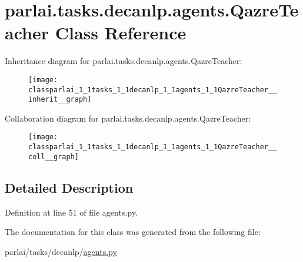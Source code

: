 \hypertarget{classparlai_1_1tasks_1_1decanlp_1_1agents_1_1QazreTeacher}{}\section{parlai.\+tasks.\+decanlp.\+agents.\+Qazre\+Teacher Class Reference}
\label{classparlai_1_1tasks_1_1decanlp_1_1agents_1_1QazreTeacher}


Inheritance diagram for parlai.\+tasks.\+decanlp.\+agents.\+Qazre\+Teacher\+:
\nopagebreak
\begin{figure}[H]
\begin{center}
\leavevmode
\texttt{[image: classparlai\_1\_1tasks\_1\_1decanlp\_1\_1agents\_1\_1QazreTeacher\_\_inherit\_\_graph]}
\end{center}
\end{figure}


Collaboration diagram for parlai.\+tasks.\+decanlp.\+agents.\+Qazre\+Teacher\+:
\nopagebreak
\begin{figure}[H]
\begin{center}
\leavevmode
\texttt{[image: classparlai\_1\_1tasks\_1\_1decanlp\_1\_1agents\_1\_1QazreTeacher\_\_coll\_\_graph]}
\end{center}
\end{figure}


\subsection{Detailed Description}


Definition at line 51 of file agents.\+py.



The documentation for this class was generated from the following file\+:\begin{DoxyCompactItemize}
\item 
parlai/tasks/decanlp/\hyperlink{parlai_2tasks_2decanlp_2agents_8py}{agents.\+py}\end{DoxyCompactItemize}
